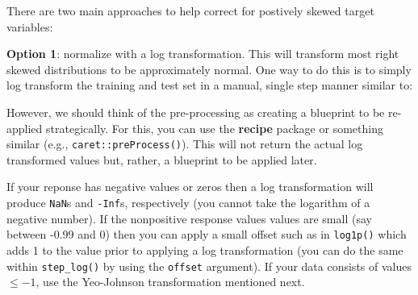 \documentclass[]{krantz}
\makeatletter
\newenvironment{Shaded}{\begin{snugshade}}{\end{snugshade}}
\newcommand{\CommentTok}[1]{\textcolor[rgb]{0.37,0.37,0.37}{\textit{#1}}}
\newcommand{\DataTypeTok}[1]{\textcolor[rgb]{0.27,0.27,0.27}{#1}}
\newcommand{\KeywordTok}[1]{\textcolor[rgb]{0.27,0.27,0.27}{\textbf{#1}}}
\newcommand{\NormalTok}[1]{#1}
\newcommand{\OperatorTok}[1]{\textcolor[rgb]{0.43,0.43,0.43}{\textbf{#1}}}
\newcommand{\StringTok}[1]{\textcolor[rgb]{0.5,0.5,0.5}{#1}}
\newenvironment{kframe}{%
\medskip{}
\setlength{\fboxsep}{.8em}
 \def\at@end@of@kframe{}%
 \ifinner\ifhmode%
  \def\at@end@of@kframe{\end{minipage}}%
  \begin{minipage}{\columnwidth}%
 \fi\fi%
 \def\FrameCommand##1{\hskip\@totalleftmargin \hskip-\fboxsep
 \colorbox{shadecolor}{##1}\hskip-\fboxsep
     \hskip-\linewidth \hskip-\@totalleftmargin \hskip\columnwidth}%
 \MakeFramed {\advance\hsize-\width
   \@totalleftmargin\z@ \linewidth\hsize
   \@setminipage}}%
 {\par\unskip\endMakeFramed%
 \at@end@of@kframe}
\renewenvironment{Shaded}{\begin{kframe}}{\end{kframe}}
\makeatother
\begin{document}
There are two main approaches to help correct for postively skewed target variables:

\textbf{Option 1}: normalize with a log transformation. This will transform most right skewed distributions to be approximately normal. One way to do this is to simply log transform the training and test set in a manual, single step manner similar to:

\begin{Shaded}
\end{Shaded}

However, we should think of the pre-processing as creating a blueprint to be re-applied strategically. For this, you can use the \textbf{recipe} package or something similar (e.g., \texttt{caret::preProcess()}). This will not return the actual log transformed values but, rather, a blueprint to be applied later.

\begin{Shaded}
\end{Shaded}

If your reponse has negative values or zeros then a log transformation will produce \texttt{NaN}s and \texttt{-Inf}s, respectively (you cannot take the logarithm of a negative number). If the nonpositive response values values are small (say between -0.99 and 0) then you can apply a small offset such as in \texttt{log1p()} which adds 1 to the value prior to applying a log transformation (you can do the same within \texttt{step\_log()} by using the \texttt{offset} argument). If your data consists of values \(\le -1\), use the Yeo-Johnson transformation mentioned next.
\end{document}
